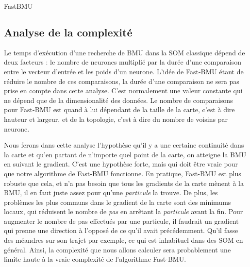 	\begin{algorithm}
	\caption{FastBMU}
	\label{fast:alg:bmu}
	\DontPrintSemicolon

	\end{algorithm}

	\subsection{Analyse de la complexité}\label{seq:complex_analysis}

	Le temps d'exécution d'une recherche de BMU dans la SOM classique dépend de deux facteurs : le nombre de neurones multiplié par la durée d'une comparaison entre le vecteur d'entrée et les poids d'un neurone. L'idée de Fast-BMU étant de réduire le nombre de ces comparaisons, la durée d'une comparaison ne sera pas prise en compte dans cette analyse. C'est normalement une valeur constante qui ne dépend que de la dimensionalité des données. Le nombre de comparaisons pour Fast-BMU est quand à lui dépendant de la taille de la carte, c'est à dire hauteur et largeur, et de la topologie, c'est à dire du nombre de voisins par neurone. 

	Nous ferons dans cette analyse l'hypothèse qu'il y a une certaine continuité dans la carte et qu'en partant de n'importe quel point de la carte, on atteigne la BMU en suivant le gradient. C'est une hypothèse forte, mais qui doit être vraie pour que notre algorithme de Fast-BMU fonctionne. En pratique, Fast-BMU est plus robuste que cela, et n'a pas besoin que tous les gradients de la carte mènent à la BMU, il en faut juste assez pour qu'une \textit{particule} la trouve. De plus, les problèmes les plus communs dans le gradient de la carte sont des minimums locaux, qui réduisent le nombre de \textit{pas} en arrêtant la \textit{particule} avant la fin. Pour augmenter le nombre de pas effectués par une particule, il faudrait un gradient qui prenne une direction à l'opposé de ce qu'il avait précédemment. Qu'il fasse des méandres sur son trajet par exemple, ce qui est inhabituel dans des SOM en général. Ainsi, la complexité que nous allons calculer sera probablement une limite haute à la vraie complexité de l'algorithme Fast-BMU. 

